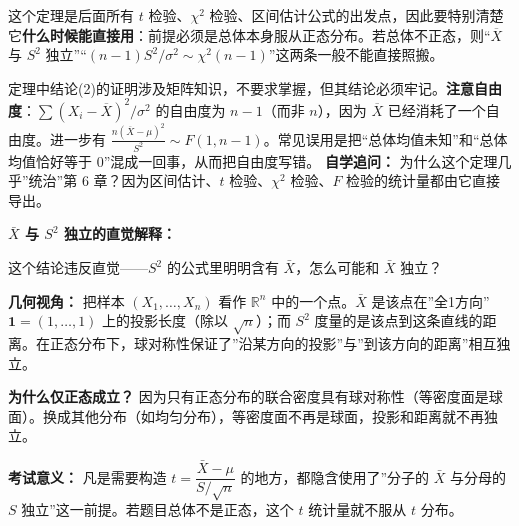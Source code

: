 ﻿\documentclass[lang=cn,11pt]{elegantbook}
\begin{document}
\begin{note}
这个定理是后面所有 \(t\) 检验、\(\chi^2\) 检验、区间估计公式的出发点，因此要特别清楚它\textbf{什么时候能直接用}：前提必须是总体本身服从正态分布。若总体不正态，则“\(\overline{X}\) 与 \(S^2\) 独立”“\((n-1)S^2/\sigma^2\sim\chi^2(n-1)\)”这两条一般不能直接照搬。

定理中结论(2)的证明涉及矩阵知识，不要求掌握，但其结论必须牢记。\textbf{注意自由度}：\(\sum(X_i-\overline{X})^2/\sigma^2\) 的自由度为 \(n-1\)（而非 \(n\)），因为 \(\overline{X}\) 已经消耗了一个自由度。进一步有 \(\displaystyle\frac{n(\overline{X}-\mu)^2}{S^2} \sim F(1,n-1)\)。常见误用是把“总体均值未知”和“总体均值恰好等于 0”混成一回事，从而把自由度写错。
\textbf{自学追问：} 为什么这个定理几乎”统治”第 6 章？因为区间估计、\(t\) 检验、\(\chi^2\) 检验、\(F\) 检验的统计量都由它直接导出。
\end{note}

\begin{note}
\textbf{$\bar X$ 与 $S^2$ 独立的直觉解释：}

这个结论违反直觉——$S^2$ 的公式里明明含有 $\bar X$，怎么可能和 $\bar X$ 独立？

\textbf{几何视角：} 把样本 $(X_1,\dots,X_n)$ 看作 $\mathbb{R}^n$ 中的一个点。$\bar X$ 是该点在”全1方向” $\mathbf{1}=(1,\dots,1)$ 上的投影长度（除以 $\sqrt{n}$）；而 $S^2$ 度量的是该点到这条直线的距离。在正态分布下，球对称性保证了”沿某方向的投影”与”到该方向的距离”相互独立。

\textbf{为什么仅正态成立？} 因为只有正态分布的联合密度具有球对称性（等密度面是球面）。换成其他分布（如均匀分布），等密度面不再是球面，投影和距离就不再独立。

\textbf{考试意义：} 凡是需要构造 $t=\dfrac{\bar X-\mu}{S/\sqrt{n}}$ 的地方，都隐含使用了”分子的 $\bar X$ 与分母的 $S$ 独立”这一前提。若题目总体不是正态，这个 $t$ 统计量就不服从 $t$ 分布。
\end{note}
\end{document}
